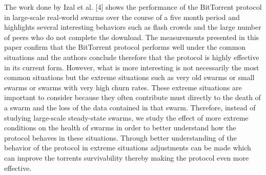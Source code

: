     The work done by Izal et al. [4] shows the performance of the BitTorrent protocol in large-scale real-world swarms over the course of a five month period and highlights several interesting behaviors such as flash crowds and the large number of peers who do not complete the download. The measurements presented in this paper confirm that the BitTorrent protocol performs well under the common situations and the authors conclude therefore that the protocol is highly effective in its current form. However, what is more interesting is not necessarily the most common situations but the extreme situations such as very old swarms or small swarms or swarms with very high churn rates. These extreme situations are important to consider because they often contribute must directly to the death of a swarm and the loss of the data contained in that swarm. Therefore, instead of studying large-scale steady-state swarms, we study the effect of more extreme conditions on the health of swarms in order to better understand how the protocol behaves in these situations. Through better understanding of the behavior of the protocol in extreme situations adjustments can be made which can improve the torrents survivability thereby making the protocol even more effective.

